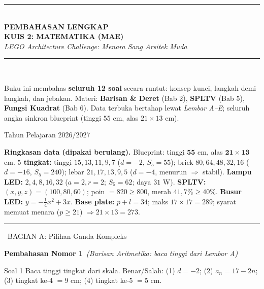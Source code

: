 \documentclass[11pt,a4paper]{article}
\newcommand{\bagianjudul}[1]{\par\bigskip\noindent%
  {\large\bfseries\color{ungu}\rule[-2pt]{4pt}{16pt}\ #1}\par\smallskip}
\newcommand{\nomorjudul}[2]{\par\bigskip\noindent%
  {\large\bfseries\color{ungu}Pembahasan Nomor #1}\ {\normalfont\itshape\color{gray}(#2)}\par\nopagebreak\smallskip}
\begin{document}
\thispagestyle{empty}
\begin{center}
\vspace*{1.5cm}
{\color{ungu}\rule{\textwidth}{2pt}}\\[0.5cm]
{\Huge\bfseries\color{ungu} PEMBAHASAN LENGKAP}\\[0.3cm]
{\LARGE\bfseries KUIS 2: MATEMATIKA (MAE)}\\[0.4cm]
{\large\itshape LEGO Architecture Challenge: Menara Sang Arsitek Muda}\\[0.3cm]
{\color{ungu}\rule{\textwidth}{2pt}}\\[1cm]

\begin{tcolorbox}[enhanced,width=0.9\textwidth,colback=ungumuda,colframe=ungu,arc=4pt,boxrule=1pt]
\centering\small
Buku ini membahas \textbf{seluruh 12 soal} secara runtut: konsep kunci, langkah
demi langkah, dan jebakan. Materi: \textbf{Barisan \& Deret} (Bab 2),
\textbf{SPLTV} (Bab 5), \textbf{Fungsi Kuadrat} (Bab 6). Data terbuka bertahap
lewat \emph{Lembar A--E}; seluruh angka sinkron blueprint (tinggi $55$ cm, alas
$21\times13$ cm).
\end{tcolorbox}

\vfill
{\large Tahun Pelajaran 2026/2027}
\end{center}
\clearpage

\begin{tips}
\textbf{Ringkasan data (dipakai berulang).}
Blueprint: tinggi $\mathbf{55}$ cm, alas $\mathbf{21\times13}$ cm.
\textbf{$5$ tingkat:} tinggi $15,13,11,9,7$ ($d=-2$, $S_5=55$); brick
$80,64,48,32,16$ ($d=-16$, $S_5=240$); lebar $21,17,13,9,5$ ($d=-4$, menurun
$\Rightarrow$ stabil). \textbf{Lampu LED:} $2,4,8,16,32$ ($a=2,r=2$; $S_5=62$;
daya $31$ W). \textbf{SPLTV:} $(x,y,z)=(100,80,60)$; poin $=820\ge800$, merah
$41{,}7\%\ge40\%$. \textbf{Busur LED:} $y=-\tfrac14x^2+3x$. \textbf{Base plate:}
$p+l=34$; maks $17\times17=289$; syarat memuat menara ($p\ge21$) $\Rightarrow
21\times13=273$.
\end{tips}

\bagianjudul{BAGIAN A: Pilihan Ganda Kompleks}

\nomorjudul{1}{Barisan Aritmetika: baca tinggi dari Lembar A}
\begin{soalbox}{Soal 1}
Baca tinggi tingkat dari skala. Benar/Salah: (1) $d=-2$; (2) $a_n=17-2n$;
(3) tingkat ke-$4$ $=9$ cm; (4) tingkat ke-$5$ $=5$ cm.
\end{soalbox}
\end{document}
